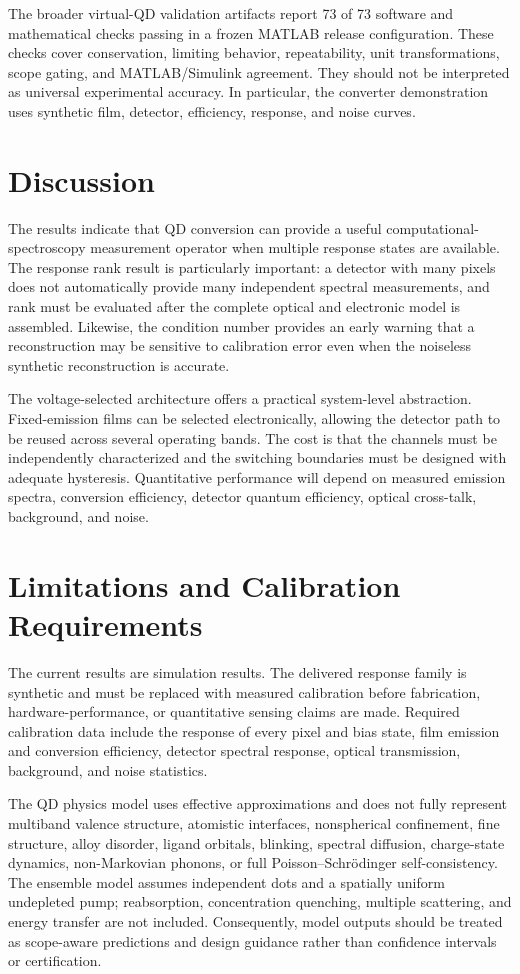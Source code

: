 \documentclass[conference]{IEEEtran}
\begin{document}
The broader virtual-QD validation artifacts report 73 of 73 software and mathematical checks passing in a frozen MATLAB release configuration. These checks cover conservation, limiting behavior, repeatability, unit transformations, scope gating, and MATLAB/Simulink agreement. They should not be interpreted as universal experimental accuracy. In particular, the converter demonstration uses synthetic film, detector, efficiency, response, and noise curves.

\section{Discussion}
The results indicate that QD conversion can provide a useful computational-spectroscopy measurement operator when multiple response states are available. The response rank result is particularly important: a detector with many pixels does not automatically provide many independent spectral measurements, and rank must be evaluated after the complete optical and electronic model is assembled. Likewise, the condition number provides an early warning that a reconstruction may be sensitive to calibration error even when the noiseless synthetic reconstruction is accurate.

The voltage-selected architecture offers a practical system-level abstraction. Fixed-emission films can be selected electronically, allowing the detector path to be reused across several operating bands. The cost is that the channels must be independently characterized and the switching boundaries must be designed with adequate hysteresis. Quantitative performance will depend on measured emission spectra, conversion efficiency, detector quantum efficiency, optical cross-talk, background, and noise.

\section{Limitations and Calibration Requirements}
The current results are simulation results. The delivered response family is synthetic and must be replaced with measured calibration before fabrication, hardware-performance, or quantitative sensing claims are made. Required calibration data include the response of every pixel and bias state, film emission and conversion efficiency, detector spectral response, optical transmission, background, and noise statistics.

The QD physics model uses effective approximations and does not fully represent multiband valence structure, atomistic interfaces, nonspherical confinement, fine structure, alloy disorder, ligand orbitals, blinking, spectral diffusion, charge-state dynamics, non-Markovian phonons, or full Poisson--Schrödinger self-consistency. The ensemble model assumes independent dots and a spatially uniform undepleted pump; reabsorption, concentration quenching, multiple scattering, and energy transfer are not included. Consequently, model outputs should be treated as scope-aware predictions and design guidance rather than confidence intervals or certification.
\end{document}
